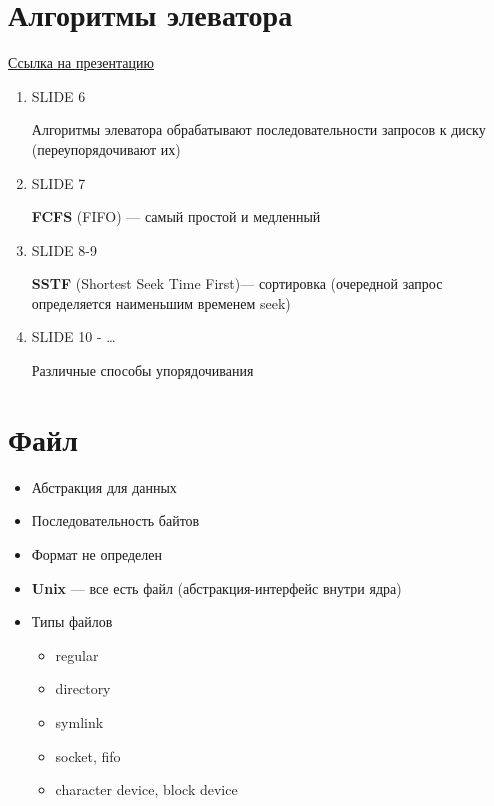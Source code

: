 \documentclass[../lectures.tex]{subfiles}
\begin{document}
\section{Алгоритмы элеватора}
\textcolor{blue}{\href{https://slideplayer.com/slide/5209336}{Ссылка на презентацию}}
\begin{enumerate}
    \item SLIDE 6
        
          Алгоритмы элеватора обрабатывают последовательности запросов к диску (переупорядочивают их)
    \item SLIDE 7

          \textbf{FCFS} (FIFO) --- самый простой и медленный
    \item SLIDE 8-9

          \textbf{SSTF} (Shortest Seek Time First)--- сортировка (очередной запрос определяется наименьшим временем seek)
    \item SLIDE 10 - \dots

          Различные способы упорядочивания
\end{enumerate}

\section{Файл}
\begin{itemize}
    \item Абстракция для данных
    \item Последовательность байтов
    \item Формат не определен
    \item \textbf{Unix} --- все есть файл (абстракция-интерфейс внутри ядра)
    \item Типы файлов 
          \begin{itemize}
            \item regular
            \item directory
            \item symlink
            \item socket, fifo
            \item character device, block device
          \end{itemize}
\end{itemize}
\end{document}
